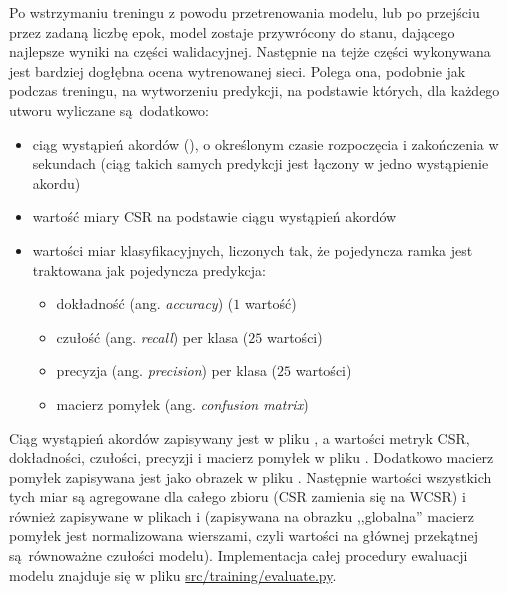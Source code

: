Po wstrzymaniu treningu z powodu przetrenowania modelu, lub po przejściu przez zadaną liczbę epok,
model zostaje przywrócony do stanu, dającego najlepsze wyniki na części walidacyjnej. Następnie na
tejże części wykonywana jest bardziej dogłębna ocena wytrenowanej sieci. Polega ona, podobnie jak
podczas treningu, na wytworzeniu predykcji, na podstawie których, dla każdego utworu wyliczane
są dodatkowo: 
\begin{itemize}
    \item ciąg wystąpień akordów (), o określonym czasie rozpoczęcia i
        zakończenia w sekundach (ciąg takich samych predykcji jest łączony w jedno wystąpienie
        akordu)
    \item wartość miary CSR na podstawie ciągu wystąpień akordów
    \item wartości miar klasyfikacyjnych, liczonych tak, że pojedyncza ramka jest traktowana jak
        pojedyncza predykcja:
        \begin{itemize}
            \item dokładność (ang. \emph{accuracy}) ($1$ wartość)
            \item czułość (ang. \emph{recall}) per klasa ($25$ wartości)
            \item precyzja (ang. \emph{precision}) per klasa ($25$ wartości)
            \item macierz pomyłek (ang. \emph{confusion matrix})
        \end{itemize}
\end{itemize}
Ciąg wystąpień akordów zapisywany jest w pliku , a wartości metryk CSR, dokładności,
czułości, precyzji i macierz pomyłek w pliku . Dodatkowo macierz pomyłek zapisywana
jest jako obrazek w pliku . Następnie wartości wszystkich tych miar są agregowane dla
całego zbioru (CSR zamienia się na WCSR) i również zapisywane w plikach  i
 (zapisywana na obrazku ,,globalna'' macierz pomyłek jest normalizowana wierszami,
czyli wartości na głównej przekątnej są równoważne czułości modelu). Implementacja całej procedury
ewaluacji modelu znajduje się w pliku \url{src/training/evaluate.py}.


